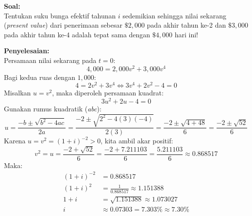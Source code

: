 \documentclass[11pt,a4paper]{article}
\begin{document}
\begin{examplebox}
\textbf{Soal:}\\
Tentukan suku bunga efektif tahunan $i$ sedemikian sehingga nilai sekarang (\textit{present value}) dari penerimaan sebesar $\$2{,}000$ pada akhir tahun ke-2 dan $\$3{,}000$ pada akhir tahun ke-4 adalah tepat sama dengan $\$4{,}000$ hari ini!

\vspace{0.5em}
\textbf{Penyelesaian:}\\
Persamaan nilai sekarang pada $t = 0$:
\begin{equation*}
    4{,}000 = 2{,}000 v^2 + 3{,}000 v^4
\end{equation*}
Bagi kedua ruas dengan $1{,}000$:
\begin{equation*}
    4 = 2 v^2 + 3 v^4 \iff 3 v^4 + 2 v^2 - 4 = 0
\end{equation*}
Misalkan $u = v^2$, maka diperoleh persamaan kuadrat:
\begin{equation*}
    3 u^2 + 2 u - 4 = 0
\end{equation*}
Gunakan rumus kuadratik (\textit{abc}):
\begin{equation*}
    u = \frac{-b \pm \sqrt{b^2 - 4ac}}{2a} = \frac{-2 \pm \sqrt{2^2 - 4(3)(-4)}}{2(3)} = \frac{-2 \pm \sqrt{4 + 48}}{6} = \frac{-2 \pm \sqrt{52}}{6}
\end{equation*}
Karena $u = v^2 = (1+i)^{-2} > 0$, kita ambil akar positif:
\begin{equation*}
    v^2 = u = \frac{-2 + \sqrt{52}}{6} = \frac{-2 + 7.211103}{6} = \frac{5.211103}{6} \approx 0.868517
\end{equation*}
Maka:
\begin{align*}
    (1 + i)^{-2} &= 0.868517 \\[0.4em]
    (1 + i)^2 &= \frac{1}{0.868517} \approx 1.151388 \\[0.4em]
    1 + i &= \sqrt{1.151388} \approx 1.073027 \\[0.4em]
    i &\approx 0.07303 = 7.303\% \approx 7.30\%
\end{align*}
\end{examplebox}
\end{document}
